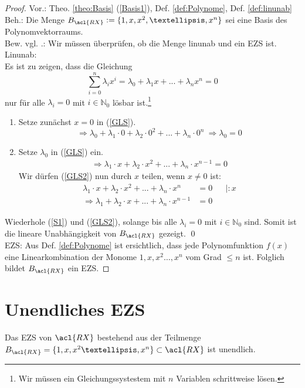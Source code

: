 \begin{proof}
\label{BewBas}
Vor.: Theo. \ref{theo:Basis} (\ref{Basis1}), Def. \ref{def:Polynome}, Def. \ref{def:linunab}
\\ Beh.: Die Menge $B_{\acl{RX}}\vcentcolon=\{1, x, x^2,…, x^n\}$ sei eine Basis des Polynomvektorraums.
\\ Bew. vgl. \cite[S. 308]{Tut}.: Wir müssen überprüfen, ob die Menge \acl{linunab} und ein \acl{EZS} ist.  
\\ \acl{Linunab}:
\\ Es ist zu zeigen, dass die Gleichung \begin{equation}\label{GLS} \sum\limits_{i=0}^n \lambda_i x^i = \lambda_0 + \lambda_1 x + ... + \lambda_n x^n = 0\end{equation} nur für alle $\lambda_i=0$ mit $i \in \mathbb{N}_0$ lösbar ist.\footnote{Wir müssen ein Gleichungssystestem mit $n$ Variablen schrittweise lösen.}
\begin{enumerate}
\item \label{S1} Setze zunächst $x=0$ in (\ref{GLS}). 
\begin{equation}\Rightarrow \lambda_0 + \lambda_1 \cdot 0 + \lambda_2 \cdot 0^2 + ... + \lambda_n \cdot 0^n\ \Rightarrow \lambda_0 = 0 \end{equation}
\item \label{GLS2} Setze $\lambda_0$ in (\ref{GLS}) ein. 
\begin{align}
\Rightarrow\lambda_1 \cdot x + \lambda_2 \cdot x^2+ ... + \lambda_n \cdot x^{n-1} = 0 
\end{align} Wir dürfen (\ref{GLS2}) nun durch $x$ teilen, wenn $x\not= 0$ ist: 
\begin{align}
\lambda_1 \cdot x + \lambda_2 \cdot x^2 +... + \lambda_n  \cdot x^n &= 0 && |:x \\ \Rightarrow \lambda_1 + \lambda_2 \cdot x+ ... + \lambda_n \cdot x^{n-1} &= 0
\end{align}
\end{enumerate}
Wiederhole (\ref{S1}) und (\ref{GLS2}), solange bis alle $\lambda_i=0$ mit $i \in \mathbb{N}_0$ sind.
Somit ist die lineare Unabhängigkeit von $B_{\acl{RX}}$ gezeigt. \qed
\\ \acl{EZS}: Aus Def. \ref{def:Polynome} ist ersichtlich, dass jede Polynomfunktion $f(x)$ eine Linearkombination der Monome $1, x,x^2 …, x^n$ vom Grad $\leq n$ ist. Folglich bildet $B_{\acl{RX}}$ ein \acl{EZS}.
\end{proof}

\newpage
\section{Unendliches \acl{EZS}}
\theoremstyle{prop}
\begin{prop} \label{propunendl} Das \acl{EZS} von $\acl{RX}$ bestehend aus der Teilmenge $B_{\acl{RX}}=\{1, x,x^2 …, x^n\}\subset\acl{RX}$ ist unendlich.
\end{prop}


